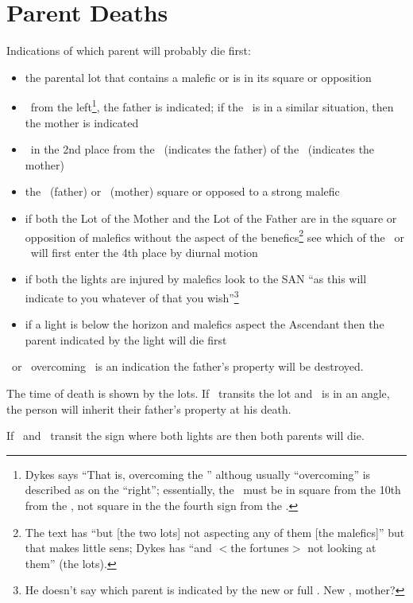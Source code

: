 \section{Parent Deaths}

Indications of which parent will probably die first:
\begin{itemize}[topsep=0em,itemsep=0em]
\item the parental lot that contains a malefic or is in its square or opposition

\item \Mars\Square\Sun\, from the left\footnote{Dykes says ``That is, overcoming the \Sun'' althoug usually ``overcoming'' is described as on the ``right''; essentially, the \Mars\, must be in square from the 10th from the \Sun, not square in the the fourth sign from the \Sun.}, the father is indicated; if the \Moon\, is in a similar situation, then the mother is indicated

\item \Mars\, in the 2nd place from the \Sun\, (indicates the father) of the \Moon\, (indicates the mother)

\item the \Sun\, (father) or \Moon\, (mother) square or opposed to a strong malefic

\item if both the Lot of the Mother and the Lot of the Father are in the square or opposition of malefics without the aspect of the benefics\footnote{The text has ``but [the two lots] not aspecting any of them [the malefics]'' but that makes little sens; Dykes has ``and $<$the fortunes$>$ not looking at them'' (the lots).} see which of the \Sun\, or \Moon\, will first enter the 4th place by diurnal motion

\item if both the lights are injured by malefics look to the SAN ``as this will indicate to you whatever of that you wish''\footnote{He doesn't say which parent is indicated by the new or full \Moon.  New \Moon, mother?}

\item if a light is below the horizon and malefics aspect the Ascendant then the parent indicated by the light will die first
\end{itemize}

\Saturn\Opposition\Mars\, or \Mars\, overcoming \Saturn\,  is an indication the father's property will be destroyed.

The time of death is shown by the lots. If \Saturn\, transits the lot and \Jupiter\, is in an angle, the person will inherit their father's property at his death.

If \Saturn\, and \Mars\, transit the sign where both lights are then both parents will die.